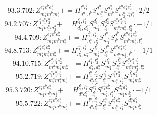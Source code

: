 \documentclass[letterpaper,10pt,fleqn,leqno,onecolumn]{article}
\begin{document}
\begin{equation} \;\;\;\;\;\;  93.3.702: Z^{e_{1}^{a}e_{1}^{b}e_{2}^{b}}_{m_{1}^{a}m_{1}^{b}m_{2}^{b}}+=H^{l_{1}^{a}l_{1}^{b}}_{d_{1}^{a},d_{1}^{b}}S^{d_{1}^{a}}_{m_{1}^{a}}S^{d_{1}^{b}}_{m_{1}^{b}}S^{e_{1}^{a}e_{1}^{b}e_{2}^{b}}_{m_{2}^{b},l_{1}^{a}l_{1}^{b}}\cdot 2/2 \end{equation}
\begin{equation} \;\;\;\;\;\;  94.2.707: Z^{e_{1}^{a}e_{1}^{b}e_{2}^{b}}_{m_{1}^{a}m_{1}^{b}m_{2}^{b}}+=H^{l_{1}^{b},l_{2}^{b}}_{d_{1}^{b},d_{2}^{b}}S^{d_{1}^{b}}_{m_{1}^{b}}S^{d_{2}^{b}}_{l_{1}^{b}}S^{e_{1}^{a}e_{1}^{b}e_{2}^{b}}_{m_{1}^{a}m_{2}^{b},l_{2}^{b}}\cdot -1/1 \end{equation}
\begin{equation} \;\;\;\;\;\;  94.4.709: Z^{e_{1}^{a}e_{1}^{b}e_{2}^{b}}_{m_{1}^{a}m_{1}^{b}m_{2}^{b}}+=H^{l_{1}^{b},l_{1}^{a}}_{d_{1}^{a},d_{1}^{b}}S^{d_{1}^{a}}_{m_{1}^{a}}S^{d_{1}^{b}}_{l_{1}^{b}}S^{e_{1}^{a}e_{1}^{b}e_{2}^{b}}_{m_{1}^{b}m_{2}^{b},l_{1}^{a}} \end{equation}
\begin{equation} \;\;\;\;\;\;  94.8.713: Z^{e_{1}^{a}e_{1}^{b}e_{2}^{b}}_{m_{1}^{a}m_{1}^{b}m_{2}^{b}}+=H^{l_{1}^{a},l_{1}^{b}}_{d_{1}^{b},d_{1}^{a}}S^{d_{1}^{b}}_{m_{1}^{b}}S^{d_{1}^{a}}_{l_{1}^{a}}S^{e_{1}^{a}e_{1}^{b}e_{2}^{b}}_{m_{1}^{a}m_{2}^{b},l_{1}^{b}}\cdot -1/1 \end{equation}
\begin{equation} \;\;\;\;\;\;  94.10.715: Z^{e_{1}^{a}e_{1}^{b}e_{2}^{b}}_{m_{1}^{a}m_{1}^{b}m_{2}^{b}}+=H^{l_{1}^{a},l_{2}^{a}}_{d_{1}^{a},d_{2}^{a}}S^{d_{1}^{a}}_{m_{1}^{a}}S^{d_{2}^{a}}_{l_{1}^{a}}S^{e_{1}^{a}e_{1}^{b}e_{2}^{b}}_{m_{1}^{b}m_{2}^{b},l_{2}^{a}} \end{equation}
\begin{equation} \;\;\;\;\;\;  95.2.719: Z^{e_{1}^{a}e_{1}^{b}e_{2}^{b}}_{m_{1}^{a}m_{1}^{b}m_{2}^{b}}+=H^{l_{1}^{b},l_{2}^{b}}_{d_{1}^{b}d_{2}^{b}}S^{e_{1}^{b}}_{l_{1}^{b}}S^{e_{1}^{a}e_{2}^{b}}_{m_{1}^{a},l_{2}^{b}}S^{d_{1}^{b}d_{2}^{b}}_{m_{1}^{b}m_{2}^{b}} \end{equation}
\begin{equation} \;\;\;\;\;\;  95.3.720: Z^{e_{1}^{a}e_{1}^{b}e_{2}^{b}}_{m_{1}^{a}m_{1}^{b}m_{2}^{b}}+=H^{l_{1}^{b},l_{1}^{a}}_{d_{1}^{a}d_{1}^{b}}S^{e_{1}^{b}}_{l_{1}^{b}}S^{e_{1}^{a}e_{2}^{b}}_{m_{1}^{b},l_{1}^{a}}S^{d_{1}^{a}d_{1}^{b}}_{m_{1}^{a}m_{2}^{b}}\cdot -1/1 \end{equation}
\begin{equation} \;\;\;\;\;\;  95.5.722: Z^{e_{1}^{a}e_{1}^{b}e_{2}^{b}}_{m_{1}^{a}m_{1}^{b}m_{2}^{b}}+=H^{l_{1}^{a},l_{1}^{b}}_{d_{1}^{a}d_{1}^{b}}S^{e_{1}^{a}}_{l_{1}^{a}}S^{e_{1}^{b}e_{2}^{b}}_{m_{1}^{b},l_{1}^{b}}S^{d_{1}^{a}d_{1}^{b}}_{m_{1}^{a}m_{2}^{b}} \end{equation}
\end{document}
